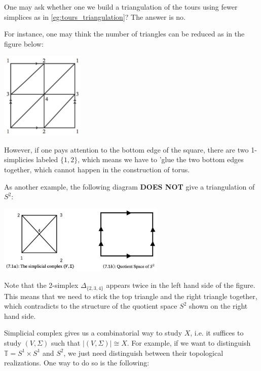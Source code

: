 \begin{example}
One may ask whether one we build a triangulation of the tours using fewer simplices as in \autoref{eg:tours_triangulation}? The answer is no. 

For instance, one may think the number of triangles can be reduced as in the figure below: 
\begin{center}
\includegraphics[width=0.3\textwidth]{images/Ch4_turous_nonex.jpg}
\end{center}
However, if one pays attention to the bottom edge of the square, there are two 1-simplicies labeled \(\{ 1,2\}\), which means we have to 'glue the two bottom edges together, which cannot happen in the construction of torus.

As another example, the following diagram {\bf DOES NOT} give a triangulation of $S^2$:
\begin{center}
\includegraphics[width=0.6\textwidth]{images/Ch4_S2_nonex.jpg}
\end{center}
Note that the 2-simplex \({\Delta }_{\{ 2,3,4\} }\) appears twice in the left hand side of the figure. This means that we need to stick the top triangle and the right triangle together, which contradicts to the structure of the quotient space \({S}^{2}\) shown on the right hand side.
\end{example}

Simplicial complex gives us a combinatorial way to study \(X\), i.e. it suffices to study \(\left( {V,\Sigma }\right)\) such that \(\left| \left( {V,\Sigma }\right) \right|  \cong  X\). 
For example, if we want to distinguish \(\mathbb{T} = {S}^{1} \times  {S}^{1}\) and \({S}^{2}\), we just need  distinguish between their topological realizations. One way to do so is the following:

